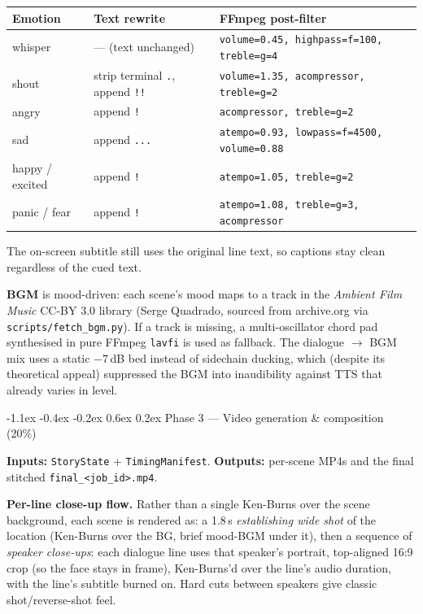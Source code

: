 \documentclass[11pt,a4paper]{article}
\makeatletter
\renewcommand\subsection{\@startsection{subsection}{2}{\z@}%
   {-1.1ex \@plus -0.4ex \@minus -0.2ex}%
   {0.6ex \@plus 0.2ex}%
   {\large\bfseries\color{accent!85!black}}}
\newcommand{\rarr}{\(\rightarrow\)}
\newcommand{\code}[1]{\texttt{\small #1}}
\makeatother
\begin{document}
\begin{tabularx}{\textwidth}{l X X}
\toprule
\textbf{Emotion} & \textbf{Text rewrite} & \textbf{FFmpeg post-filter} \\
\midrule
whisper & --- (text unchanged) & \code{volume=0.45, highpass=f=100, treble=g=4} \\
shout & strip terminal \texttt{.}, append \texttt{!!} & \code{volume=1.35, acompressor, treble=g=2} \\
angry & append \texttt{!} & \code{acompressor, treble=g=2} \\
sad & append \texttt{...} & \code{atempo=0.93, lowpass=f=4500, volume=0.88} \\
happy / excited & append \texttt{!} & \code{atempo=1.05, treble=g=2} \\
panic / fear & append \texttt{!} & \code{atempo=1.08, treble=g=3, acompressor} \\
\bottomrule
\end{tabularx}

The on-screen subtitle still uses the original line text, so captions stay
clean regardless of the cued text.

\textbf{BGM} is mood-driven: each scene's mood maps to a track in the
\emph{Ambient Film Music} CC-BY 3.0 library (Serge Quadrado, sourced from
archive.org via \code{scripts/fetch\_bgm.py}). If a track is missing, a
multi-oscillator chord pad synthesised in pure FFmpeg \code{lavfi} is used as
fallback. The dialogue \rarr{} BGM mix uses a static $-7$\,dB bed instead of
sidechain ducking, which (despite its theoretical appeal) suppressed the BGM
into inaudibility against TTS that already varies in level.

\subsection{Phase 3 --- Video generation \& composition (20\%)}

\textbf{Inputs:} \code{StoryState} + \code{TimingManifest}.
\textbf{Outputs:} per-scene MP4s and the final stitched \code{final\_<job\_id>.mp4}.

\textbf{Per-line close-up flow.} Rather than a single Ken-Burns over the scene
background, each scene is rendered as: a 1.8\,s \emph{establishing wide shot}
of the location (Ken-Burns over the BG, brief mood-BGM under it), then a
sequence of \emph{speaker close-ups}: each dialogue line uses that speaker's
portrait, top-aligned 16:9 crop (so the face stays in frame), Ken-Burns'd over
the line's audio duration, with the line's subtitle burned on. Hard cuts
between speakers give classic shot/reverse-shot feel.
\end{document}
